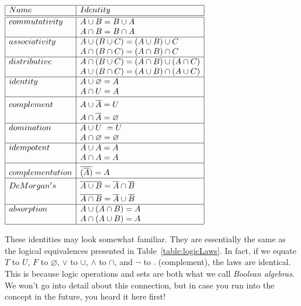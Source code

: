 \begin{table}[bht]
\centering
$
\begin{array}{|l|l|}
\hline
Name&Identity\\
\hline
\hline
commutativity	& A\cup B=B\cup A\\
				& A\cap B = B\cap A\\
\hline
associativity	&A\cup(B\cup C)=(A\cup B)\cup C\\
				&A\cap(B\cap C)=(A\cap B)\cap C\\
\hline
distributive&	A\cap(B\cup C) = (A\cap B) \cup (A\cap C)\\
			&	A\cup(B\cap C) = (A\cup B)\cap(A\cup C)\\
\hline
identity&		A \cup \varnothing  = A\\
			&		A\cap U = A\\
\hline
complement&A\cup \overline{A} = U\rule{0in}{.17in}\\ %
		& A\cap\overline{A} = \varnothing\rule{0in}{.17in} \\
\hline
domination&	  	 A\cup U \ = U\\
			&	A\cap \varnothing  = \varnothing \\
\hline
idempotent&		A\cup A=A\\
			&	 A\cap A = A\\
\hline
complementation	& \overline{(\overline{A})}=A	\rule{0in}{.2in}\\
\hline
De Morgan's	&	 \overline{A \cup B} = \overline{A}\cap\overline{B}\rule{0in}{.17in}\\
			&	\overline{A\cap B} = \overline{A}\cup\overline{B}\rule{0in}{.17in}\\
\hline
absorption & A\cup(A\cap B) = A\\
& A\cap(A\cup B) = A\\
\hline
\end{array}
$
\caption{Set Identities}\label{table:setIdentities}
\end{table}

These identities may look somewhat familiar.
They are
essentially the same as the logical equivalences presented in Table~\ref{table:logicLaws}.
In fact, if we equate $T$ to $U$, $F$ to $\varnothing$, $\vee$ to $\cup$, 
$\wedge$ to $\cap$, and $\neg$ to $\bar{ }$ (complement), 
the laws are identical.
This is because logic operations and sets are both what we call {\em Boolean algebras}.
We won't go into detail about this connection, but in case you run into the concept
in the future, you heard it here first!




